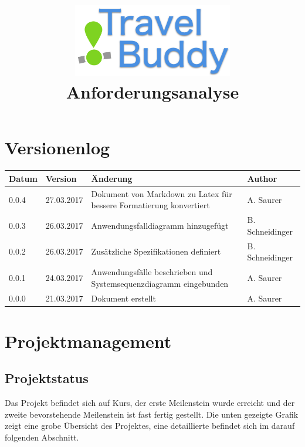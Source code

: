 \documentclass[a4paper,10pt,xetex]{article}
\title{
  \includegraphics[width=7cm]{travel-buddy_white}\\[\bigskipamount]
  Anforderungsanalyse\\[\bigskipamount]
}
\author{\documentauthors}
\date{\parbox{\linewidth}{\centering%
  IT15TA ZH \hspace*{3cm} Gruppe 3\endgraf\bigskip
  \documentdate\endgraf
}}
\begin{document}
\maketitle\newpage

{
\hypersetup{linkcolor=black}
\setcounter{tocdepth}{3}
\tableofcontents
}
\newpage

\section{Versionenlog}\label{versionenlog}

\tabulinesep=1.2mm

\begin{longtabu} to \textwidth { | l | l | X[l] | l | }
  \hline
  \textbf{Datum} & \textbf{Version} & \textbf{Änderung} & \textbf{Author} \\
  \hline
  \endhead

  0.0.4 & 27.03.2017 & Dokument von Markdown zu Latex für bessere Formatierung konvertiert & A. Saurer\\
  \hline

  0.0.3 & 26.03.2017 & Anwendungsfalldiagramm hinzugefügt & B. Schneidinger\\
  \hline

  0.0.2 & 26.03.2017 & Zusätzliche Spezifikationen definiert & B. Schneidinger\\
  \hline

  0.0.1 & 24.03.2017 & Anwendungsfälle beschrieben und Systemsequenzdiagramm eingebunden & A. Saurer\\
  \hline

  0.0.0 & 21.03.2017 & Dokument erstellt & A. Saurer\\
  \hline
\end{longtabu}
\newpage

\section{Projektmanagement}\label{projektmanagement}


\subsection{Projektstatus}\label{projektstatus}
Das Projekt befindet sich auf Kurs, der erste Meilenstein wurde erreicht
und der zweite bevorstehende Meilenstein ist fast fertig gestellt. Die
unten gezeigte Grafik zeigt eine grobe Übersicht des Projektes, eine
detaillierte befindet sich im darauf folgenden Abschnitt.
\end{document}
